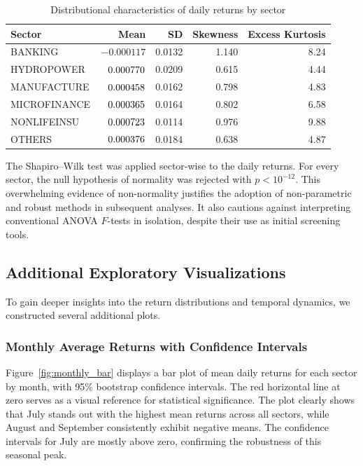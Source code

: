 \documentclass[12pt,a4paper,fleqn]{article}
\begin{document}
\begin{table}[ht]
\centering
\caption{Distributional characteristics of daily returns by sector}
\label{tab:distribution}
\begin{tabular}{lrrrr}
\toprule
Sector & Mean & SD & Skewness & Excess Kurtosis \\
\midrule
BANKING       & $-0.000117$ & 0.0132 & 1.140 & 8.24 \\
HYDROPOWER    & $\hphantom{-}0.000770$ & 0.0209 & 0.615 & 4.44 \\
MANUFACTURE   & $\hphantom{-}0.000458$ & 0.0162 & 0.798 & 4.83 \\
MICROFINANCE  & $\hphantom{-}0.000365$ & 0.0164 & 0.802 & 6.58 \\
NONLIFEINSU   & $\hphantom{-}0.000723$ & 0.0114 & 0.976 & 9.88 \\
OTHERS        & $\hphantom{-}0.000376$ & 0.0184 & 0.638 & 4.87 \\
\bottomrule
\end{tabular}
\end{table}

The Shapiro–Wilk test \cite{shapiro1965variance} was applied sector-wise to the daily returns. For every sector, the null hypothesis of normality was rejected with \(p < 10^{-12}\). This overwhelming evidence of non-normality justifies the adoption of non-parametric and robust methods in subsequent analyses. It also cautions against interpreting conventional ANOVA \(F\)-tests in isolation, despite their use as initial screening tools.

\subsection{Additional Exploratory Visualizations}

To gain deeper insights into the return distributions and temporal dynamics, we constructed several additional plots.

\subsubsection{Monthly Average Returns with Confidence Intervals}

Figure~\ref{fig:monthly_bar} displays a bar plot of mean daily returns for each sector by month, with 95\% bootstrap confidence intervals. The red horizontal line at zero serves as a visual reference for statistical significance. The plot clearly shows that July stands out with the highest mean returns across all sectors, while August and September consistently exhibit negative means. The confidence intervals for July are mostly above zero, confirming the robustness of this seasonal peak.
\end{document}
